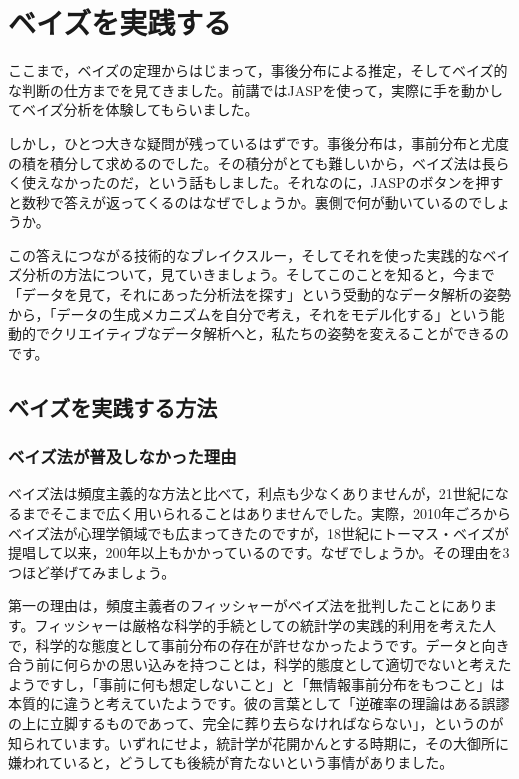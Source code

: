\documentclass{ltjbook}
\begin{document}
\VerbatimFootnotes

\chapter{ベイズを実践する}
\label{ch29_bayesianModeling}

ここまで，ベイズの定理からはじまって，事後分布による推定，そしてベイズ的な判断の仕方までを見てきました。前講ではJASPを使って，実際に手を動かしてベイズ分析を体験してもらいました。

しかし，ひとつ大きな疑問が残っているはずです。事後分布は，事前分布と尤度の積を積分して求めるのでした。その積分がとても難しいから，ベイズ法は長らく使えなかったのだ，という話もしました。それなのに，JASPのボタンを押すと数秒で答えが返ってくるのはなぜでしょうか。裏側で何が動いているのでしょうか。

この答えにつながる技術的なブレイクスルー，そしてそれを使った実践的なベイズ分析の方法について，見ていきましょう。そしてこのことを知ると，今まで「データを見て，それにあった分析法を探す」という受動的なデータ解析の姿勢から，「データの生成メカニズムを自分で考え，それをモデル化する」という能動的でクリエイティブなデータ解析へと，私たちの姿勢を変えることができるのです。

\section{ベイズを実践する方法}
\subsection{ベイズ法が普及しなかった理由}

ベイズ法は頻度主義的な方法と比べて，利点も少なくありませんが，21世紀になるまでそこまで広く用いられることはありませんでした。実際，2010年ごろからベイズ法が心理学領域でも広まってきたのですが，18世紀にトーマス・ベイズが提唱して以来，200年以上もかかっているのです。なぜでしょうか。その理由を3つほど挙げてみましょう。

第一の理由は，頻度主義者のフィッシャーがベイズ法を批判したことにあります。フィッシャーは厳格な科学的手続としての統計学の実践的利用を考えた人で，科学的な態度として事前分布の存在が許せなかったようです。データと向き合う前に何らかの思い込みを持つことは，科学的態度として適切でないと考えたようですし，「事前に何も想定しないこと」と「無情報事前分布をもつこと」は本質的に違うと考えていたようです。彼の言葉として「逆確率の理論はある誤謬の上に立脚するものであって、完全に葬り去らなければならない」，というのが知られています。いずれにせよ，統計学が花開かんとする時期に，その大御所に嫌われていると，どうしても後続が育たないという事情がありました。
\end{document}
